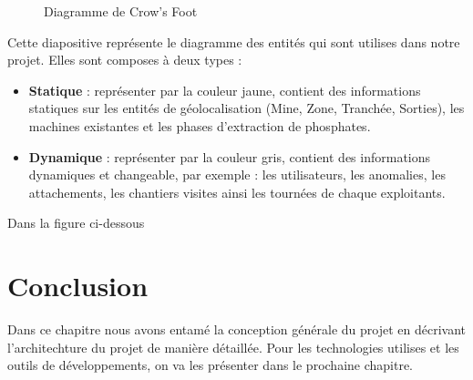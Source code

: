 \begin{figure}[H]
	\caption{\label{fig:my-label} Diagramme de Crow's Foot}
\end{figure}

Cette diapositive repr\'esente le diagramme des entit\'es qui sont utilises dans notre projet. Elles sont composes \`a deux types :
\begin{itemize}
\item \textbf{Statique} : repr\'esenter par la couleur jaune, contient des informations statiques sur les entit\'es de g\'eolocalisation (Mine, Zone, Tranch\'ee, Sorties), les machines existantes et les phases d'extraction de phosphates.
\item \textbf{Dynamique} : repr\'esenter par la couleur gris, contient des informations dynamiques et changeable, par exemple : les utilisateurs, les anomalies, les attachements, les chantiers visites ainsi les tourn\'ees de chaque exploitants.
\end{itemize}

Dans la figure ci-dessous 

\section{Conclusion}

Dans ce chapitre nous avons entam\'e la conception g\'en\'erale du projet en d\'ecrivant l'architechture du projet de mani\`ere d\'etaill\'ee. Pour les technologies utilises et les outils de d\'eveloppements, on va les pr\'esenter dans le prochaine chapitre.

